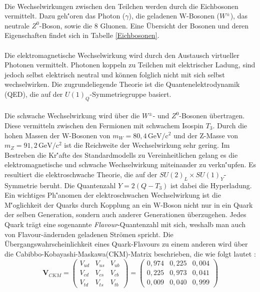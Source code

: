 \\
Die Wechselwirkungen zwischen den Teilchen werden durch die Eichbosonen vermittelt. Dazu geh\''oren das Photon ($\gamma$), die geladenen W-Bosonen ($W^{\pm}$), das neutrale $Z^{0}$-Boson, sowie die 8 Gluonen. Eine \"Ubersicht der Bosonen und deren Eigenschaften findet sich in Tabelle \ref{Eichbosonen}. \\
\\

Die elektromagnetische Wechselwirkung wird durch den Austausch virtueller Photonen vermittelt. Photonen koppeln zu Teilchen mit elektrischer Ladung, sind jedoch selbst elektrisch neutral und k\"onnen folglich nicht mit sich selbst wechselwirken. Die zugrundeliegende Theorie ist die Quantenelektrodynamik (QED), die auf der $U(1)_{Q}$-Sym\-me\-trie\-grup\-pe basiert.\\
\\
Die schwache Wechselwirkung wird \"uber die $W^{\pm}$- und $Z^{0}$-Bosonen \"ubertragen. Diese vermitteln zwischen den Fermionen mit schwachem Isospin $T_{3}$. Durch die hohen Massen der W-Bosonen von $m_{W} = 80,4\,\mathrm{GeV/c^{2}}$ und der Z-Masse von $m_{Z} = 91,2\,\mathrm{GeV/c^{2}}$ ist die Reichweite der Wechselwirkung sehr gering. Im Bestreben die Kr\''afte des Standardmodells zu Vereinheitlichen gelang es die elektromagnetische und schwache Wechselwirkung miteinander zu verkn\''upfen. Es resultiert die elektroschwache Theorie, die auf der $SU(2)_{L}\times SU(1)_{Y}$-Symmetrie beruht. Die Quantenzahl $Y = 2(Q - T_{3})$ ist dabei die Hyperladung.\\
Ein wichtiges Ph\''anomen der elektroschwachen Wechselwirkung ist die M\''oglichkeit der Quarks durch Kopplung an ein W-Boson nicht nur in ein Quark der selben Generation, sondern auch anderer Generationen \"uberzugehen. Jedes Quark tr\"agt eine sogenannte \textit{Flavour}-Quantenzahl mit sich, weshalb man auch von Flavour-\"andernden geladenen Str\"omen spricht. Die \"Ubergangswahrscheinlichkeit eines Quark-Flavours zu einem anderen wird \"uber die Ca\-bibbo-\-Ko\-ba\-ya\-shi-\-Maska\-wa\-(CKM)-\-Matrix beschrieben, die wie folgt lautet \cite{pdg}:
\begin{equation}
\textbf{V}_{CKM}=\begin{pmatrix} V_{ud} & V_{us} & V_{ub} \\ V_{cd} & V_{cs} & V_{cb} \\ V_{td} & V_{ts} & V_{tb} \end{pmatrix}=\begin{pmatrix} 0,974 & 0,225 & 0,004 \\ 0,225 & 0,973 & 0,041 \\ 0,009 & 0,040 & 0,999 \end{pmatrix}
\label{CKMmatrix}
\end{equation}
